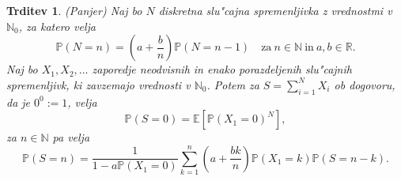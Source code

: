 \documentclass[12pt, a4paper, reqno]{amsart}
\theoremstyle{definition}
\theoremstyle{plain}
\newtheorem{trditev}[definicija]{Trditev}
\newcommand{\R}{\mathbb{R}}
\newcommand{\N}{\mathbb{N}}
\newcommand{\E}{\mathbb{E}}
\newcommand{\Prob}{\mathbb{P}}
\newcommand{\1}{\mathds{1}}
\begin{document}
    \begin{trditev}(Panjer)
        Naj bo $N$ diskretna slu"cajna spremenljivka z vrednostmi v $\N_0$, za katero velja 
        \begin{equation*}
            \Prob(N = n) = \left(a + \frac{b}{n}\right)\Prob\left(N = n-1\right) \quad \text{za} \ n\in\N \ \text{in} \ a, b \in \R.
        \end{equation*}
        Naj bo $X_1, X_2, \dots$ zaporedje neodvisnih in enako porazdeljenih slu"cajnih spremenljivk, ki 
        zavzemajo vrednosti v $\N_0$. Potem za $S = \sum_{i=1}^NX_i$ ob dogovoru, da je $0^0:=1$, velja
        \begin{equation*}
        \Prob\left(S = 0\right) =  \E\left[\Prob\left(X_1 = 0\right)^N\right],
        \end{equation*}
        za $n\in\N$ pa velja
        \begin{equation}
            \Prob(S = n) = \frac{1}{1 - a\Prob(X_1 = 0)}\sum_{k = 1}^n\left(a + \frac{bk}{n}\right)\Prob(X_1 = k)\Prob(S = n - k).
            \label{eq:PanjerRecursionScheme}
        \end{equation}
        \label{tdr:PanjerRecursionScheme}
    \end{trditev}
\end{document}
